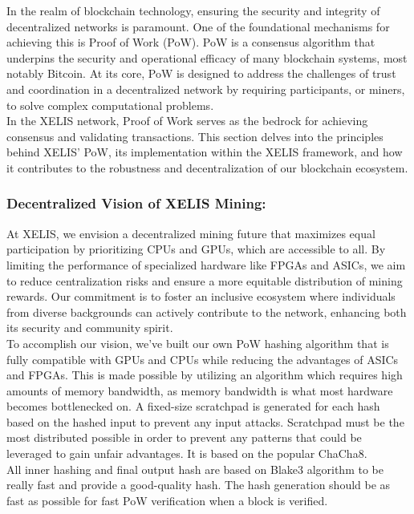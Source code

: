 \documentclass[10pt,a4paper,twocolumn]{article}
\begin{document}
In the realm of blockchain technology, ensuring the security and integrity of decentralized networks is paramount. One of the foundational mechanisms for achieving this is Proof of Work (PoW). PoW is a consensus algorithm that underpins the security and operational efficacy of many blockchain systems, most notably Bitcoin. At its core, PoW is designed to address the challenges of trust and coordination in a decentralized network by requiring participants, or miners, to solve complex computational problems.\\

In the XELIS network, Proof of Work serves as the bedrock for achieving consensus and validating transactions. This section delves into the principles behind XELIS’ PoW, its implementation within the XELIS framework, and how it contributes to the robustness and decentralization of our blockchain ecosystem.\\

\subsubsection{Decentralized Vision of XELIS Mining:}

At XELIS, we envision a decentralized mining future that maximizes equal participation by prioritizing CPUs and GPUs, which are accessible to all. By limiting the performance of specialized hardware like FPGAs and ASICs, we aim to reduce centralization risks and ensure a more equitable distribution of mining rewards. Our commitment is to foster an inclusive ecosystem where individuals from diverse backgrounds can actively contribute to the network, enhancing both its security and community spirit.\\

To accomplish our vision, we’ve built our own PoW hashing algorithm that is fully compatible with GPUs and CPUs while reducing the advantages of ASICs and FPGAs. This is made possible by utilizing an algorithm which requires high amounts of memory bandwidth, as memory bandwidth is what most hardware becomes bottlenecked on. A fixed-size scratchpad is generated for each hash based on the hashed input to prevent any input attacks. Scratchpad must be the most distributed possible in order to prevent any patterns that could be leveraged to gain unfair advantages. It is based on the popular ChaCha8.\\

All inner hashing and final output hash are based on Blake3 algorithm to be really fast and provide a good-quality hash. The hash generation should be as fast as possible for fast PoW verification when a block is verified.\\
\end{document}
